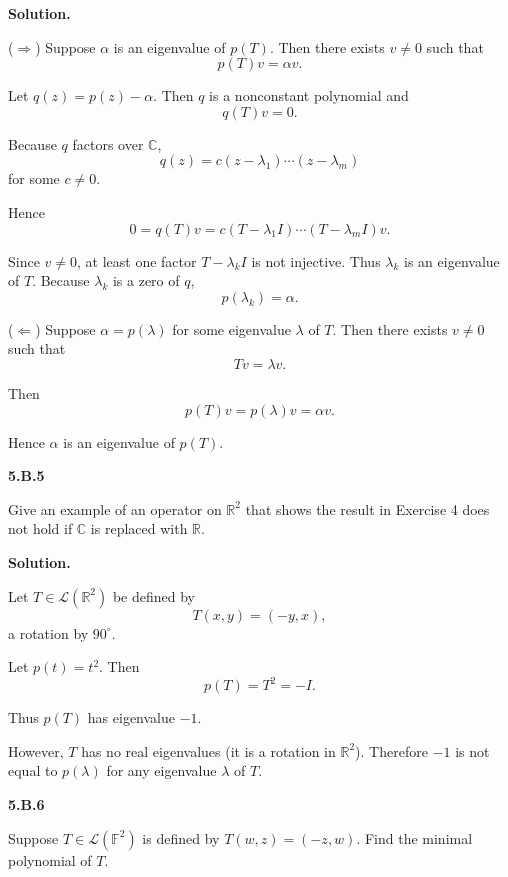 \documentclass[11pt]{article}
\newcommand{\ProblemDivider}[1]{%
  \vspace{1.0em}
  \noindent\textbf{#1}\par
  \vspace{0.35em}
}
\newcommand{\ProblemAnnounce}{\noindent}
\newcommand{\SolutionAnnounce}{\noindent\textbf{Solution.}\par\medskip}
\begin{document}
\begin{solutionBox}
\SolutionAnnounce
\doublespacing

($\Rightarrow$)
Suppose $\alpha$ is an eigenvalue of $p(T)$.
Then there exists $v \neq 0$ such that
\[
p(T)v = \alpha v.
\]

Let $q(z) = p(z) - \alpha$.
Then $q$ is a nonconstant polynomial and
\[
q(T)v = 0.
\]

Because $q$ factors over $\mathbb{C}$,
\[
q(z) = c(z-\lambda_1)\cdots(z-\lambda_m)
\]
for some $c \neq 0$.

Hence
\[
0 = q(T)v = c(T-\lambda_1 I)\cdots(T-\lambda_m I)v.
\]

Since $v \neq 0$, at least one factor $T-\lambda_k I$
is not injective. Thus $\lambda_k$ is an eigenvalue of $T$.
Because $\lambda_k$ is a zero of $q$,
\[
p(\lambda_k)=\alpha.
\]

($\Leftarrow$)
Suppose $\alpha=p(\lambda)$ for some eigenvalue $\lambda$ of $T$.
Then there exists $v\neq 0$ such that
\[
Tv=\lambda v.
\]

Then
\[
p(T)v=p(\lambda)v=\alpha v.
\]

Hence $\alpha$ is an eigenvalue of $p(T)$.

\end{solutionBox}

\ProblemDivider{5.B.5}

\begin{problemBox}
\ProblemAnnounce
Give an example of an operator on $\mathbb{R}^2$ that shows the result in Exercise 4
does not hold if $\mathbb{C}$ is replaced with $\mathbb{R}$.
\end{problemBox}

\begin{solutionBox}
\SolutionAnnounce
\doublespacing

Let $T \in \mathcal{L}(\mathbb{R}^2)$ be defined by
\[
T(x,y)=(-y,x),
\]
a rotation by $90^\circ$.

Let $p(t)=t^2$.
Then
\[
p(T)=T^2=-I.
\]

Thus $p(T)$ has eigenvalue $-1$.

However, $T$ has no real eigenvalues (it is a rotation in $\mathbb{R}^2$).
Therefore $-1$ is not equal to $p(\lambda)$ for any eigenvalue $\lambda$ of $T$.

\end{solutionBox}

\ProblemDivider{5.B.6}

\begin{problemBox}
\ProblemAnnounce
Suppose $T \in \mathcal{L}(\mathbb{F}^2)$ is defined by
$T(w,z)=(-z,w)$. Find the minimal polynomial of $T$.
\end{problemBox}
\end{document}
